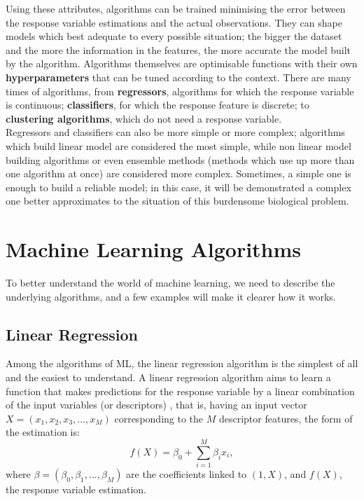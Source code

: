 Using these attributes, algorithms can be trained minimising the error between the response variable estimations and the actual observations. They can shape models which best adequate to every possible situation; the bigger the dataset and the more the information in the features, the more accurate the model built by the algorithm. Algorithms themselves are optimisable functions with their own \textbf{hyperparameters} that can be tuned according to the context. There are many times of algorithms, from \textbf{regressors}, algorithms for which the response variable is continuous; \textbf{classifiers}, for which the response feature is discrete; to \textbf{clustering algorithms}, which do not need a response variable.\\

Regressors and classifiers can also be more simple or more complex; algorithms which build linear model are considered the most simple, while non linear model building algorithms or even ensemble methods (methods which use up more than one algorithm at once) are considered more complex. Sometimes, a simple one is enough to build a reliable model; in this case, it will be demonstrated a complex one better approximates to the situation of this burdensome biological problem.

\section{Machine Learning Algorithms}
To better understand the world of machine learning, we need to describe the underlying algorithms, and a few examples will make it clearer how it works.
\subsection{Linear Regression}
Among the algorithms of ML, the linear regression algorithm is the simplest of all and the easiest to understand. 
A linear regression algorithm aims to learn a function that makes predictions for the response variable by a linear combination of the input variables (or descriptors) \cite{Zhou21a}, that is, having an input vector $X=(x_1,x_2,x_3,...,x_M)$ corresponding to the $M$ descriptor features, the form of the estimation is:
\begin{equation}
\label{eqn:f(X)}
    f(X)=\beta_0+\sum_{i=1}^M\beta_ix_i,
\end{equation}
where $\beta=(\beta_0,\beta_1,...,\beta_M)$ are the coefficients linked to $(1,X)$, and $f(X)$, the response variable estimation.

